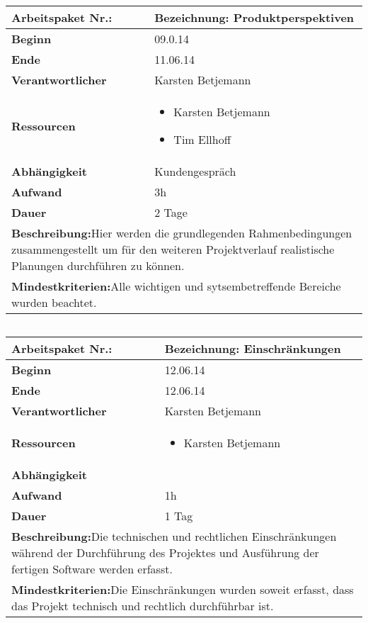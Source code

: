 \documentclass[fontsize=12pt,paper=a4,twoside]{scrartcl}
\begin{document}
	\begin{tabular}{|p{5.3cm}|p{9.7cm}|}\hline
		\textbf{Arbeitspaket Nr.:}  & \textbf{Bezeichnung:} Produktperspektiven\\ \hline \hline
		\textbf{Beginn} & 09.0.14\\ \hline
		\textbf{Ende} & 11.06.14\\ \hline
		\textbf{Verantwortlicher} & Karsten Betjemann\\ \hline
		\textbf{Ressourcen} & \begin{itemize}
			\item Karsten Betjemann
			\item Tim Ellhoff
		\end{itemize}    \\ \hline
		\textbf{Abhängigkeit} & Kundengespräch\\ \hline
		\textbf{Aufwand} & 3h\\ \hline
		\textbf{Dauer} & 2 Tage\\ \hline
		\multicolumn{2}{|p{15cm}|}{\textbf{Beschreibung:}\newline Hier werden die grundlegenden Rahmenbedingungen zusammengestellt um für den weiteren Projektverlauf realistische Planungen durchführen zu können. }\\ \hline
		\multicolumn{2}{|p{15cm}|}{\textbf{Mindestkriterien:}\newline Alle wichtigen und sytsembetreffende Bereiche wurden beachtet. }\\ \hline
	\end{tabular}
	
	\begin{verbatim} 
	\end{verbatim}
	
	
	\begin{tabular}{|p{5.3cm}|p{9.7cm}|}\hline
		\textbf{Arbeitspaket Nr.:}  & \textbf{Bezeichnung:} Einschränkungen\\ \hline \hline
		\textbf{Beginn} & 12.06.14\\ \hline
		\textbf{Ende} & 12.06.14\\ \hline
		\textbf{Verantwortlicher} & Karsten Betjemann\\ \hline
		\textbf{Ressourcen} & \begin{itemize}
			\item Karsten Betjemann
		\end{itemize}    \\ \hline
		\textbf{Abhängigkeit} &\\ \hline
		\textbf{Aufwand} & 1h\\ \hline
		\textbf{Dauer} & 1 Tag\\ \hline
		\multicolumn{2}{|p{15cm}|}{\textbf{Beschreibung:}\newline Die technischen und rechtlichen Einschränkungen während der Durchführung des Projektes und Ausführung der 
			fertigen Software werden erfasst. }\\ \hline
		\multicolumn{2}{|p{15cm}|}{\textbf{Mindestkriterien:}\newline Die Einschränkungen wurden soweit erfasst, dass das Projekt technisch und rechtlich durchführbar ist. }\\ \hline
	\end{tabular}
	
\end{document}

